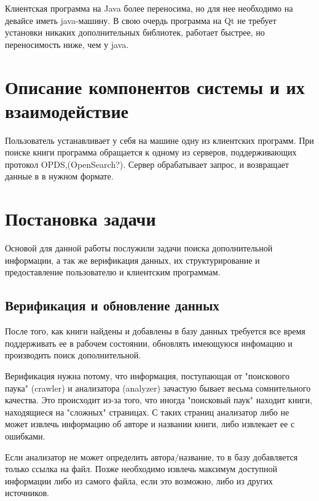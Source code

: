 \documentclass[a4paper]{report}
\begin{document}
Клиентская программа на Java более переносима, но для нее необходимо на девайсе иметь java-машину. В свою очердь программа на Qt не требует установки никаких дополнительных библиотек, работает быстрее, но переносимость ниже, чем у java.
		
\section{Описание компонентов системы и их взаимодействие}


Пользователь устанавливает у себя на машине одну из клиентских программ. При поиске книги программа обращается к одному из серверов, поддерживающих протокол OPDS,(OpenSearch?). Сервер обрабатывает запрос, и возвращает данные в в нужном формате. 





\section{Постановка задачи}

Основой для данной работы послужили задачи поиска дополнительной информации, а так же верификация данных, их структурирование  и предоставление пользователю и клиентским программам.


\subsection{Верификация и обновление данных}

После того, как книги найдены и добавлены в базу данных требуется все время поддерживать ее в рабочем состоянии, обновлять имеющуюся инфомацию и производить поиск дополнительной.

Верификация нужна потому, что информация, поступающая от "поискового паука" (crawler) и анализатора (analyzer) зачастую бывает весьма сомнительного качества. Это происходит из-за того, что иногда "поисковый паук" находит книги, находящиеся на "сложных" страницах. С таких страниц анализатор либо не может извлечь информацию об авторе и названии книги, либо извлекает ее с ошибками. 

Если анализатор не может определить автора/название, то в базу добавляется только ссылка на файл. Позже необходимо извлечь максимум доступной информации либо из самого файла, если это возможно, либо из других источников.
\end{document}
